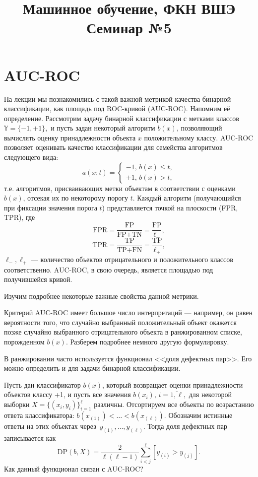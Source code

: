 \documentclass[12pt,a4paper]{article}
\title{Машинное обучение, ФКН ВШЭ\\Семинар №5}
\author{}
\date{}
\begin{document}
	\maketitle
	\section{AUC-ROC}
	\par На лекции мы познакомились с такой важной метрикой качества бинарной классификации, как площадь под ROC-кривой (AUC-ROC). Напомним её определение. Рассмотрим задачу бинарной классификации с метками классов $\mathbb{Y} = \{ -1, +1\},$ и пусть задан некоторый алгоритм $b(x)$, позволяющий вычислять оценку принадлежности объекта $x$ положительному классу. AUC-ROC позволяет оценивать качество классификации для семейства алгоритмов следующего вида:
	$$a(x; t) = \begin{cases}
		-1, \, b(x) \le  t,\\
		+1, \, b(x) > t,
	\end{cases}$$
	т.е. алгоритмов, присваивающих метки объектам в соответствии с оценками $b(x)$, отсекая их по некоторому порогу $t$. Каждый алгоритм (получающийся при фиксации значения порога $t$) представляется точкой на плоскости (FPR, TPR), где
	$$\text{FPR} = \frac{\text{FP}}{\text{FP}+\text{TN}} = \frac{\text{FP}}{\ell_-},$$
	$$\text{TPR} = \frac{\text{TP}}{\text{TP}+\text{FN}} = \frac{\text{TP}}{\ell_+},$$
	$\ell_-, \ell_+$ — количество объектов отрицательного и положительного классов соответственно. AUC-ROC, в свою очередь, является площадью под получившейся кривой.
	\par Изучим подробнее некоторые важные свойства данной метрики.
	
	\vspace{0.5cm}
	\par Критерий AUC-ROC имеет большое число интерпретаций — например, он равен вероятности того, что случайно выбранный положительный объект окажется позже случайно выбранного отрицательного объекта в ранжированном списке, порожденном $b(x)$. Разберем подробнее немного другую формулировку.
	
	\begin{vkProblem}
		В ранжировании часто используется функционал <<доля дефектных пар>>. Его можно определить и для задачи бинарной классификации.
	\par Пусть дан классификатор  $b(x)$, который возвращает оценки принадлежности объектов классу +1, и пусть все значения $b(x_i), \, i= \overline{1, \ell},$ для некоторой выборки $X = \{\left(x_i, y_i\right)\}_{i=1}^\ell$ различны. Отсортируем все объекты по возрастанию ответа классификатора: $b(x_{(1)}) < \dots < b(x_{(\ell)})$. Обозначим истинные ответы на этих объектах через~$y_{(1)}, \dots, y_{(\ell)}.$ Тогда доля дефектных пар записывается как
	$$\text{DP}(b, X) = \frac{2}{\ell(\ell-1)} \sum_{i < j}^\ell [y_{(i)} > y_{(j)}].$$
	Как данный функционал связан с AUC-ROC?
	\end{vkProblem}
	
\end{document}
